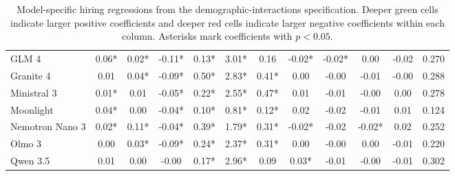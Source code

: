 \begin{table}[p]
\begin{tabular}{lccccccccccr}
GLM 4 & \cellcolor[HTML]{5FCD94}0.06* & \cellcolor[HTML]{DDF4E8}0.02* & \cellcolor[HTML]{E74C3C}-0.11* & \cellcolor[HTML]{C8EEDA}0.13* & \cellcolor[HTML]{40C37F}3.01* & \cellcolor[HTML]{B7E9CF}0.16 & \cellcolor[HTML]{F9D4D0}-0.02* & \cellcolor[HTML]{E85344}-0.02* & \cellcolor[HTML]{F0FAF5}0.00 & \cellcolor[HTML]{E85040}-0.02 & 0.270 \\
Granite 4 & \cellcolor[HTML]{E5F7EE}0.01 & \cellcolor[HTML]{B4E8CC}0.04* & \cellcolor[HTML]{EB6759}-0.09* & \cellcolor[HTML]{2EBE73}0.50* & \cellcolor[HTML]{4BC787}2.83* & \cellcolor[HTML]{47C683}0.41* & \cellcolor[HTML]{FBFEFC}0.00 & \cellcolor[HTML]{FEF5F4}-0.00 & \cellcolor[HTML]{F1958B}-0.01 & \cellcolor[HTML]{FFFDFD}-0.00 & 0.288 \\
Ministral 3 & \cellcolor[HTML]{D9F3E6}0.01* & \cellcolor[HTML]{E9F8F1}0.01 & \cellcolor[HTML]{F3A8A0}-0.05* & \cellcolor[HTML]{A3E2C1}0.22* & \cellcolor[HTML]{5DCD92}2.55* & \cellcolor[HTML]{2EBE73}0.47* & \cellcolor[HTML]{EFFAF4}0.01 & \cellcolor[HTML]{F7C3BE}-0.01 & \cellcolor[HTML]{FDEEED}-0.00 & \cellcolor[HTML]{DDF4E8}0.00 & 0.278 \\
Moonlight & \cellcolor[HTML]{8FDCB4}0.04* & \cellcolor[HTML]{FCFEFD}0.00 & \cellcolor[HTML]{F6BBB5}-0.04* & \cellcolor[HTML]{D4F2E2}0.10* & \cellcolor[HTML]{CBEFDC}0.81* & \cellcolor[HTML]{C8EEDA}0.12* & \cellcolor[HTML]{D2F1E1}0.02 & \cellcolor[HTML]{ED7A6F}-0.02 & \cellcolor[HTML]{EE8176}-0.01 & \cellcolor[HTML]{73D4A2}0.01 & 0.124 \\
Nemotron Nano 3 & \cellcolor[HTML]{D5F2E3}0.02* & \cellcolor[HTML]{2EBE73}0.11* & \cellcolor[HTML]{F6BCB6}-0.04* & \cellcolor[HTML]{5ACC90}0.39* & \cellcolor[HTML]{8DDCB3}1.79* & \cellcolor[HTML]{76D4A3}0.31* & \cellcolor[HTML]{FAD8D4}-0.02* & \cellcolor[HTML]{F08C81}-0.02 & \cellcolor[HTML]{E74C3C}-0.02* & \cellcolor[HTML]{30BF74}0.02 & 0.252 \\
Olmo 3 & \cellcolor[HTML]{FEFFFF}0.00 & \cellcolor[HTML]{D1F1E0}0.03* & \cellcolor[HTML]{EB6B5D}-0.09* & \cellcolor[HTML]{99DFBB}0.24* & \cellcolor[HTML]{68D09A}2.37* & \cellcolor[HTML]{73D4A1}0.31* & \cellcolor[HTML]{FDFEFE}0.00 & \cellcolor[HTML]{FEF8F7}-0.00 & \cellcolor[HTML]{FCFEFD}0.00 & \cellcolor[HTML]{F9D0CB}-0.01 & 0.220 \\
Qwen 3.5 & \cellcolor[HTML]{EFFAF4}0.01 & \cellcolor[HTML]{F9FDFB}0.00 & \cellcolor[HTML]{FFFBFB}-0.00 & \cellcolor[HTML]{B7E9CF}0.17* & \cellcolor[HTML]{43C481}2.96* & \cellcolor[HTML]{D7F3E4}0.09 & \cellcolor[HTML]{C3ECD7}0.03* & \cellcolor[HTML]{F2A299}-0.01 & \cellcolor[HTML]{FBE4E2}-0.00 & \cellcolor[HTML]{F9D0CC}-0.01 & 0.302 \\
\hline
\end{tabular}
\caption{Model-specific hiring regressions from the demographic-interactions specification. Deeper green cells indicate larger positive coefficients and deeper red cells indicate larger negative coefficients within each column. Asterisks mark coefficients with $p < 0.05$.}
\label{tab:appendix-model-specific-regressions-interactions}
\end{table}
